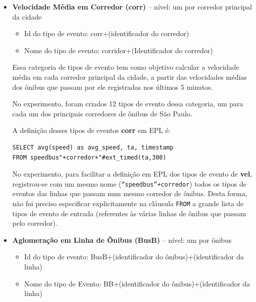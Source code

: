\begin{itemize}

\item \textbf{Velocidade Média em Corredor (corr)} -- nível: um por corredor principal da cidade

\begin{itemize}
    \item Id do tipo de evento: corr+(identificador do corredor)
    \item Nome do tipo de evento: corridor+(Identificador do corredor)
\end{itemize}


Essa categoria de tipos de evento tem como objetivo calcular a velocidade média em cada corredor principal da cidade, a partir das velocidades médias dos ônibus que passam por ele registradas nos últimos 5 minutos. 

No experimento, foram criados 12 tipos de evento dessa categoria, um para cada um dos principais corredores de ônibus de São Paulo.

A definição desses tipos de eventos \textbf{corr} em EPL é:
\begin{verbatim}
SELECT avg(speed) as avg_speed, ta, timestamp 
FROM speedbus"+corredor+"#ext_timed(ta,300)
\end{verbatim}

No experimento, para facilitar a definição em EPL dos tipos de evento de \textbf{vel}, registrou-se com um mesmo nome (\texttt{``speedbus''+corredor}) todos os tipos de eventos das linhas que passam num mesmo corredor de ônibus. Desta forma, não foi preciso especificar explicitamente na cláusula \texttt{FROM} a grande lista de tipos de evento de entrada (referentes às várias linhas de ônibus que passam pelo corredor).

\item \textbf{Aglomeração em Linha de Ônibus (BusB)} -- nível: um por ônibus

\begin{itemize}
    \item Id do tipo de evento: BusB+(identificador do ônibus)+(identificador da linha)
    \item Nome do tipo de Evento: BB+(identificador do ônibus)+(identificador da linha)
\end{itemize}


\end{itemize}
